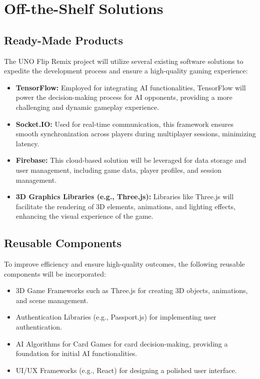 \documentclass{article}
\begin{document}
\section{Off-the-Shelf Solutions}

\subsection{Ready-Made Products}
The UNO Flip Remix project will utilize several existing software solutions to expedite the development process and ensure a high-quality gaming experience:
\begin{itemize}
    \item \textbf{TensorFlow:} Employed for integrating AI functionalities, TensorFlow will power the decision-making process for AI opponents, providing a more challenging and dynamic gameplay experience.
    \item \textbf{Socket.IO:} Used for real-time communication, this framework ensures smooth synchronization across players during multiplayer sessions, minimizing latency.
    \item \textbf{Firebase:} This cloud-based solution will be leveraged for data storage and user management, including game data, player profiles, and session management.
    \item \textbf{3D Graphics Libraries (e.g., Three.js):} Libraries like Three.js will facilitate the rendering of 3D elements, animations, and lighting effects, enhancing the visual experience of the game.
\end{itemize}

\subsection{Reusable Components}
To improve efficiency and ensure high-quality outcomes, the following reusable components will be incorporated:
\begin{itemize}
    \item 3D Game Frameworks such as Three.js for creating 3D objects, animations, and scene management.
    \item Authentication Libraries (e.g., Passport.js) for implementing user authentication.
    \item AI Algorithms for Card Games for card decision-making, providing a foundation for initial AI functionalities.
    \item UI/UX Frameworks (e.g., React) for designing a polished user interface.
\end{itemize}
\end{document}
